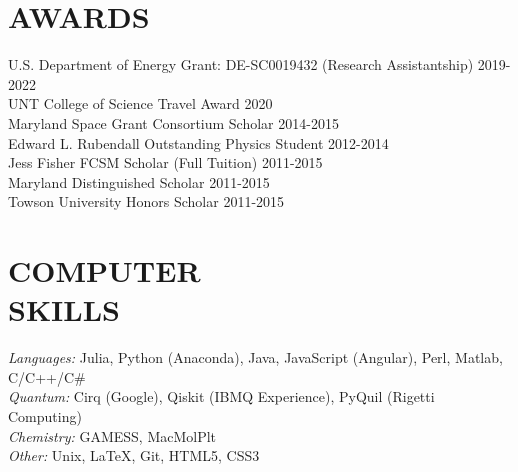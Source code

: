 \documentclass[overlapped, 10pt]{res} %
\begin{document}
\begin{resume}



\section{AWARDS}

U.S. Department of Energy Grant: DE-SC0019432 (Research Assistantship) \hfill 2019-2022 \\
UNT College of Science Travel Award \hfill 2020 \\
Maryland Space Grant Consortium Scholar \hfill 2014-2015 \\
Edward L. Rubendall Outstanding Physics Student \hfill 2012-2014 \\
Jess Fisher FCSM Scholar (Full Tuition) \hfill 2011-2015 \\
Maryland Distinguished Scholar \hfill 2011-2015 \\
Towson University Honors Scholar \hfill 2011-2015



\section{COMPUTER\\SKILLS}

{\sl Languages:} Julia, Python (Anaconda), Java, JavaScript (Angular), Perl, Matlab, C/C++/C\# \\
{\sl Quantum:} Cirq (Google), Qiskit (IBMQ Experience), PyQuil (Rigetti Computing) \\
{\sl Chemistry:} GAMESS, MacMolPlt \\
{\sl Other:} Unix, LaTeX, Git, HTML5, CSS3


\end{resume}
\end{document}
